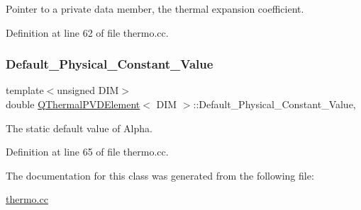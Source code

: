 Pointer to a private data member, the thermal expansion coefficient. 



Definition at line 62 of file thermo.\+cc.

\mbox{\label{classQThermalPVDElement_ad0722326e8c25746f63b35a46cac5886}} 
\subsubsection{\texorpdfstring{Default\+\_\+\+Physical\+\_\+\+Constant\+\_\+\+Value}{Default\_Physical\_Constant\_Value}}
{\footnotesize\ttfamily template$<$unsigned D\+IM$>$ \\
double \hyperlink{classQThermalPVDElement}{Q\+Thermal\+P\+V\+D\+Element}$<$ D\+IM $>$\+::Default\+\_\+\+Physical\+\_\+\+Constant\+\_\+\+Value\hspace{0.3cm}{\ttfamily [static]}, {\ttfamily [private]}}



The static default value of Alpha. 



Definition at line 65 of file thermo.\+cc.



The documentation for this class was generated from the following file\+:\begin{DoxyCompactItemize}
\item 
\hyperlink{thermo_8cc}{thermo.\+cc}\end{DoxyCompactItemize}

